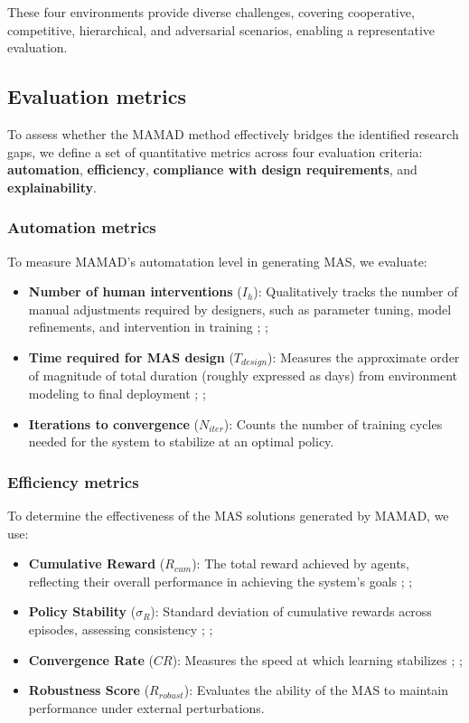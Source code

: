 \documentclass[pdflatex,sn-mathphys-num]{sn-jnl}%
\theoremstyle{thmstyleone}%
\theoremstyle{thmstyletwo}%
\theoremstyle{thmstylethree}%
\begin{document}
\noindent These four environments provide diverse challenges, covering cooperative, competitive, hierarchical, and adversarial scenarios, enabling a representative evaluation.


\subsection{Evaluation metrics}

To assess whether the MAMAD method effectively bridges the identified research gaps, we define a set of quantitative metrics across four evaluation criteria: \textbf{automation}, \textbf{efficiency}, \textbf{compliance with design requirements}, and \textbf{explainability}.

\subsubsection{Automation metrics}
To measure MAMAD's automatation level in generating MAS, we evaluate:
\begin{itemize}
    \item \textbf{Number of human interventions} ($I_h$): Qualitatively tracks the number of manual adjustments required by designers, such as parameter tuning, model refinements, and intervention in training ; ;
    \item \textbf{Time required for MAS design} ($T_{design}$): Measures the approximate order of magnitude of total duration (roughly expressed as days) from environment modeling to final deployment ; ;
    \item \textbf{Iterations to convergence} ($N_{iter}$): Counts the number of training cycles needed for the system to stabilize at an optimal policy.
\end{itemize}

\subsubsection{Efficiency metrics}
To determine the effectiveness of the MAS solutions generated by MAMAD, we use:
\begin{itemize}
    \item \textbf{Cumulative Reward} ($R_{cum}$): The total reward achieved by agents, reflecting their overall performance in achieving the system's goals ; ;
    \item \textbf{Policy Stability} ($\sigma_R$): Standard deviation of cumulative rewards across episodes, assessing consistency ; ;
    \item \textbf{Convergence Rate} ($CR$): Measures the speed at which learning stabilizes ; ;
    \item \textbf{Robustness Score} ($R_{robust}$): Evaluates the ability of the MAS to maintain performance under external perturbations.
\end{itemize}
\end{document}
